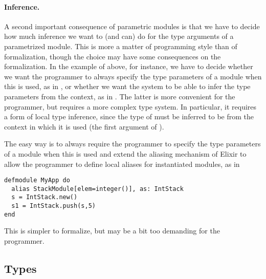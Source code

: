 \documentclass[a4paper,10pt]{article}
\begin{document}
\paragraph{Inference.} A second important consequence of parametric modules is that we have to decide how much inference we want to (and can) do for the type arguments of a parametrized module. This is more a matter of programming style than of formalization, though the choice may have some consequences on the formalization.
In the example of  above, for instance, we have to decide whether we want the programmer to always specify the type parameters of a module when this is used, as in , or whether we want the system to be able to infer the type parameters from the context, as in . The latter is more convenient for the programmer, but requires a more complex type system. In particular, it requires a form of local type inference, since the type of  must be inferred to be  from the context in which it is used (the first argument of ). 

The easy way is to always require the programmer to specify the type parameters of a module when this is used and extend the aliasing mechanism of Elixir to allow the programmer to define local aliases for instantiated modules, as in
\begin{verbatim}
defmodule MyApp do
  alias StackModule[elem=integer()], as: IntStack
  s = IntStack.new()
  s1 = IntStack.push(s,5)
end
\end{verbatim}
This is simpler to formalize, but may be a bit too demanding for the programmer.



\subsection{Types}\label{sec:types}
\end{document}
